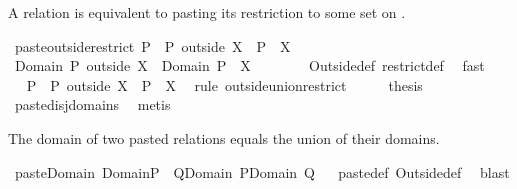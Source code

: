 \begin{isabellebody}
\begin{isamarkuptext}
A relation  is equivalent to pasting its restriction to some set  on 
  .%
\end{isamarkuptext}%
\isamarkuptrue%
\isamarkupfalse%
\ paste{\isacharunderscore}outside{\isacharunderscore}restrict{\isacharcolon}\ {\isachardoublequoteopen}P\ {\isacharequal}\ {\isacharparenleft}P\ outside\ X{\isacharparenright}\ {\isacharplus}{\isacharasterisk}\ {\isacharparenleft}P\ {\isacharbar}{\isacharbar}\ X{\isacharparenright}{\isachardoublequoteclose}\isanewline
%
\isadelimproof
%
\endisadelimproof
%
\isatagproof
{}\isamarkupfalse%
\ {\isacharminus}\isanewline
\ \ \isamarkupfalse%
\ {\isachardoublequoteopen}Domain\ {\isacharparenleft}P\ outside\ X{\isacharparenright}\ {\isasyminter}\ Domain\ {\isacharparenleft}P\ {\isacharbar}{\isacharbar}\ X{\isacharparenright}\ {\isacharequal}\ {\isacharbraceleft}{\isacharbraceright}{\isachardoublequoteclose}\isanewline
\ \ \ \ \isamarkupfalse%
\ Outside{\isacharunderscore}def\ restrict{\isacharunderscore}def\ \isamarkupfalse%
\ fast\isanewline
\ \ \isamarkupfalse%
\ \isamarkupfalse%
\ {\isachardoublequoteopen}P\ {\isacharequal}\ P\ outside\ X\ {\isasymunion}\ P\ {\isacharbar}{\isacharbar}\ X{\isachardoublequoteclose}\ \isamarkupfalse%
\ {\isacharparenleft}rule\ outside{\isacharunderscore}union{\isacharunderscore}restrict{\isacharparenright}\isanewline
\ \ \isamarkupfalse%
\ \isamarkupfalse%
\ {\isacharquery}thesis\ \isamarkupfalse%
\ paste{\isacharunderscore}disj{\isacharunderscore}domains\ \isamarkupfalse%
\ metis\isanewline
{}\isamarkupfalse%
%
\endisatagproof
{\isafoldproof}%
%
\isadelimproof
%
\endisadelimproof
%
\begin{isamarkuptext}%
The domain of two pasted relations equals the union of their domains.%
\end{isamarkuptext}%
\isamarkuptrue%
\isamarkupfalse%
\ paste{\isacharunderscore}Domain{\isacharcolon}\ {\isachardoublequoteopen}Domain{\isacharparenleft}P\ {\isacharplus}{\isacharasterisk}\ Q{\isacharparenright}{\isacharequal}Domain\ P{\isasymunion}Domain\ Q{\isachardoublequoteclose}%
\isadelimproof
\ %
\endisadelimproof
%
\isatagproof
{}\isamarkupfalse%
\ paste{\isacharunderscore}def\ Outside{\isacharunderscore}def\ \isamarkupfalse%
\ blast%
\endisatagproof
{\isafoldproof}%
%
\isadelimproof
%
\endisadelimproof

\end{isabellebody}
